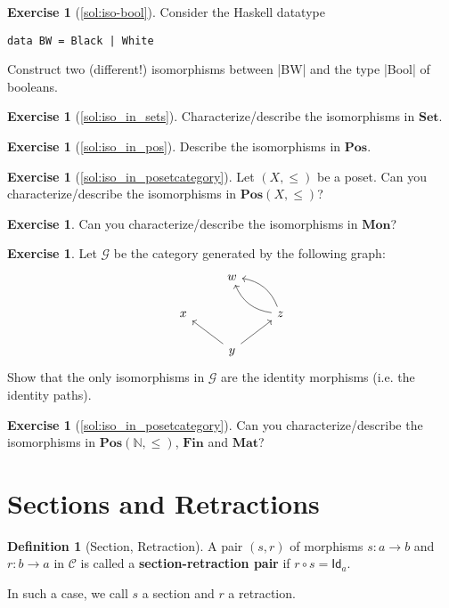 \documentclass[a4paper,11pt, oneside,titlepage=false]{scrbook}
\theoremstyle{plain}
\theoremstyle{definition}
\newtheorem{dfn}[thm]{Definition}
\newtheorem{exer}[thm]{Exercise}
\newcommand{\cfont}[1]{\ensuremath{\mathsf{#1}}}
\newcommand{\Cat}[1]{\mathcal{#1}}
\newcommand{\CC}{\Cat{C}}
\newcommand{\Catb}[1]{\mathbf{#1}}
\newcommand{\SET}{\Catb{Set}}
\newcommand{\POS}{\Catb{Pos}}
\newcommand{\MON}{\Catb{Mon}}
\newcommand{\MAT}{\Catb{Mat}}
\newcommand{\SKELFINSET}{\Catb{Fin}}
\newcommand{\Id}[1][]{\cfont{Id}_{#1}}
\newcommand{\co}[2]{\ensuremath{#2 \circ #1}}
\newcommand{\NN}{\ensuremath{\mathbb{N}}}
\begin{document}
\begin{exer}[\cref{sol:iso-bool}]\label{exer:iso-bool}
  Consider the Haskell datatype
\begin{lstlisting}
data BW = Black | White
\end{lstlisting}
Construct two (different!) isomorphisms between |BW| and the type |Bool| of booleans.
\end{exer}

\begin{exer}[\cref{sol:iso_in_sets}]\label{exer:iso_in_sets}
  Characterize/describe the isomorphisms in $\SET$.
\end{exer}

\begin{exer}[\cref{sol:iso_in_pos}]\label{exer:iso_in_pos}
  Describe the isomorphisms in $\POS$.
\end{exer}

\begin{exer}[\cref{sol:iso_in_posetcategory}]\label{exer:iso_in_posetcategory} Let $(X,\leq)$ be a poset. Can you characterize/describe the isomorphisms in $\POS(X,\leq)$?
\end{exer}

\begin{exer} Can you characterize/describe the isomorphisms in $\MON$?
\end{exer}

\begin{exer} Let $\mathcal{G}$ be the category generated by the following graph:
\[
\begin{tikzcd}
& w & \\
x & & z \arrow[lu, bend left] \arrow[lu,bend right] \\
& y \arrow[lu] \arrow[ru] &
\end{tikzcd}
\]
Show that the only isomorphisms in $\mathcal{G}$ are the identity morphisms (i.e. the identity paths).
\end{exer}

\begin{exer}[\cref{sol:iso_in_posetcategory}] \label{exer:iso_in_cats_of_nats}
Can you characterize/describe the isomorphisms in $\POS(\NN,\leq)$, $\SKELFINSET$ and $\MAT$?
\end{exer}

\section{Sections and Retractions}
\label{sec:sections}


\begin{dfn}[Section, Retraction]
  A pair $(s,r)$ of morphisms $s : a \to b$ and $r : b \to a$ in $\CC$ is called a \textbf{section-retraction pair} if $\co{s}{r} = \Id[a]$.

  In such a case, we call $s$ a section and $r$ a retraction.
\end{dfn}
\end{document}
